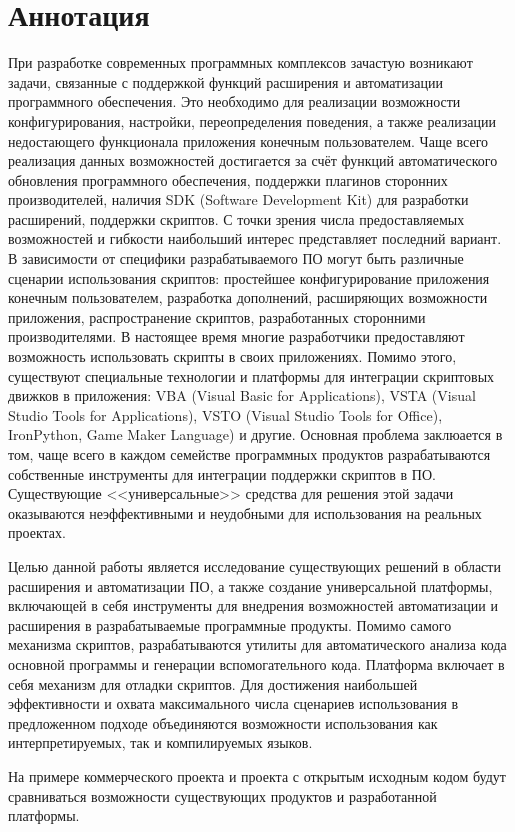\setcounter{secnumdepth}{0}
\section*{Аннотация}
\setcounter{secnumdepth}{2}

При разработке современных программных комплексов зачастую возникают задачи, связанные с поддержкой функций расширения и автоматизации программного обеспечения. Это необходимо для реализации возможности конфигурирования, настройки, переопределения поведения, а также реализации недостающего функционала приложения конечным пользователем. Чаще всего реализация данных возможностей достигается за счёт функций автоматического обновления программного обеспечения, поддержки плагинов сторонних производителей, наличия SDK (Software Development Kit) для разработки расширений, поддержки скриптов. С точки зрения числа предоставляемых возможностей и гибкости наибольший интерес представляет последний вариант. В зависимости от специфики разрабатываемого ПО могут быть различные сценарии использования скриптов: простейшее конфигурирование приложения конечным пользователем, разработка дополнений, расширяющих возможности приложения, распространение скриптов, разработанных сторонними производителями. В настоящее время многие разработчики предоставляют возможность использовать скрипты в своих приложениях. Помимо этого, существуют специальные технологии и платформы для интеграции скриптовых движков в приложения: VBA (Visual Basic for Applications), VSTA (Visual Studio Tools for Applications), VSTO (Visual Studio Tools for Office), IronPython, Game Maker Language) и другие. Основная проблема заклюается в том, чаще всего в каждом семействе программных продуктов разрабатываются собственные инструменты для интеграции поддержки скриптов в ПО. Существующие <<универсальные>> средства для решения этой задачи оказываются неэффективными и неудобными для использования на реальных проектах.

Целью данной работы является исследование существующих решений в области расширения и автоматизации ПО, а также создание универсальной платформы, включающей в себя инструменты для внедрения возможностей автоматизации и расширения в разрабатываемые программные продукты. Помимо самого механизма скриптов, разрабатываются утилиты для автоматического анализа кода основной программы и генерации вспомогательного кода. Платформа включает в себя механизм для отладки скриптов. Для достижения наибольшей эффективности и охвата максимального числа сценариев использования в предложенном подходе объединяются возможности использования как интерпретируемых, так и компилируемых языков. 

На примере коммерческого проекта и проекта с открытым исходным кодом будут сравниваться возможности существующих продуктов и разработанной платформы. 
\pagebreak